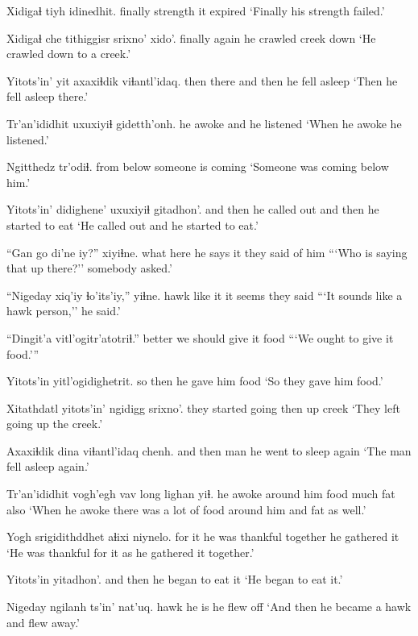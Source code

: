 \documentclass[12pt]{article}
\begin{document}
\gll Xidigaɬ tiyh  idinedhit.
finally strength {it expired}
\glt `Finally his strength failed.'
\glend

\gll Xidigaɬ che tithiggisr srixno' xido'.
finally  again {he crawled} creek  down
\glt `He crawled down to a creek.'
\glend

\gll Yitots'in' yit axaxiɬdik viɬantl'idaq.
then  there {and then} {he fell asleep}
\glt `Then he fell asleep there.'
\glend

\gll Tr'an'ididhit uxuxiyiɬ gidetth'onh.
{he awoke} and {he listened}
\glt `When he awoke he listened.'
\glend

\gll Ngitthedz tr'odiɬ.
{from below} {someone is coming}
\glt `Someone was coming below him.'
\glend

\gll Yitots'in' didighene' uxuxiyiɬ gitadhon'.
{and then} {he called out} {and then} {he started to eat}
\glt `He called out and he started to eat.'
\glend

\gll ``Gan go di'ne  iy?'' xiyiɬne.
what here {he says} it {they said of him}
\glt ```Who is saying that up there?'' somebody asked.'
\glend

\gll ``Nigeday xiq'iy ɬo'its'iy,'' yiɬne.
hawk  {like it} {it seems} {they said}
\glt ```It sounds like a hawk person,'' he said.'
\glend

\gll ``Dingit'a vitl'ogitr'atotriɬ.''
better {we should give it food}
\glt ```We ought to give it food.'''
\glend

\gll Yitots'in yitl'ogidighetrit.
{so then} {he gave him food}
\glt `So they gave him food.'
\glend

\gll Xitathdatl  yitots'in' ngidigg srixno'.
{they started going} then  up  creek
\glt `They left going up the creek.'
\glend

\gll Axaxiɬdik dina viɬantl'idaq chenh.
{and then} man {he went to sleep} again
\glt `The man fell asleep again.'
\glend

\gll Tr'an'ididhit vogh'egh vav long lighan yiɬ.
{he awoke} {around him} food much fat  also
\glt `When he awoke there was a lot of food around him and fat as well.'
\glend

\gll Yogh srigidithddhet aɬixi  niynelo.
{for it} {he was thankful} together {he gathered it}
\glt `He was thankful for it as he gathered it together.'
\glend

\gll Yitots'in yitadhon'.
{and then} {he began to eat it}
\glt `He began to eat it.'
\glend

\gll Nigeday ngilanh ts'in' nat'uq.
hawk  {he is} {} {he flew off}
\glt `And then he became a hawk and flew away.'
\glend
\end{document}
